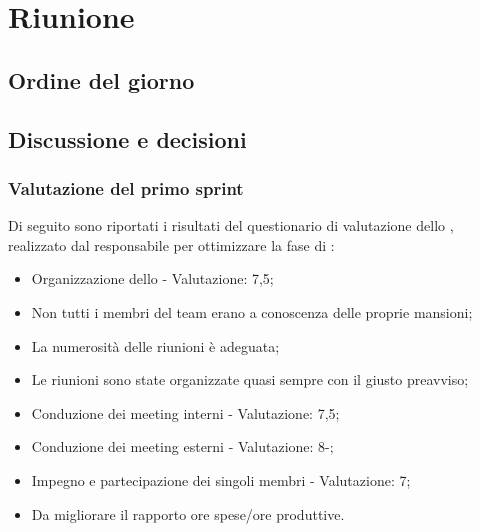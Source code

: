 \section{Riunione}
\subsection{Ordine del giorno}

\subsection{Discussione e decisioni}

\subsubsection{Valutazione del primo sprint}
\par Di seguito sono riportati i risultati del questionario di valutazione dello , realizzato dal responsabile per ottimizzare la fase di :
\begin{itemize}
  \item Organizzazione dello  - Valutazione: 7,5;
  \item Non tutti i membri del team erano a conoscenza delle proprie mansioni;
  \item La numerosità delle riunioni è adeguata;
  \item Le riunioni sono state organizzate quasi sempre con il giusto preavviso;
  \item Conduzione dei meeting interni - Valutazione: 7,5;
  \item Conduzione dei meeting esterni - Valutazione: 8-;
  \item Impegno e partecipazione dei singoli membri - Valutazione: 7;
  \item Da migliorare il rapporto ore spese/ore produttive.
\end{itemize}

